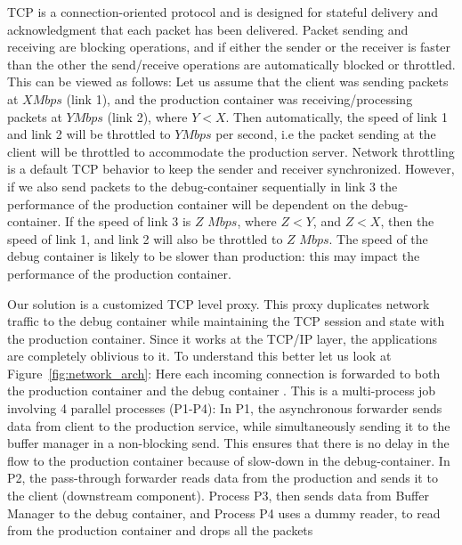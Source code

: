 TCP is a connection-oriented protocol and is designed for stateful delivery and acknowledgment that each packet has been delivered.
Packet sending and receiving are blocking operations, and if either the sender or the receiver is faster than the other the send/receive operations are automatically blocked or throttled.
This can be viewed as follows: Let us assume that the client was sending packets at $X Mbps$ (link 1), and the production container was receiving/processing packets at $Y Mbps$ (link 2), where $Y<X$. 
Then automatically, the speed of link 1 and link 2 will be throttled to $Y Mbps$ per second, i.e the packet sending at the client will be throttled to accommodate the production server. 
Network throttling is a default TCP behavior to keep the sender and receiver synchronized.
However, if we also send packets to the debug-container sequentially in link 3 the performance of the production container will be dependent on the debug-container. 
If the speed of link 3 is $Z$ $Mbps$, where $Z < Y$, and $Z < X$, then the speed of link 1, and link 2 will also be throttled to $Z$ $Mbps$.
The speed of the debug container is likely to be slower than production: this may impact the performance of the production container.

Our solution is a customized TCP level proxy. 
This proxy duplicates network traffic to the debug container while maintaining the TCP session and state with the production container. 
Since it works at the TCP/IP layer, the applications are completely oblivious to it.
To understand this better let us look at Figure~\ref{fig:network_arch}: Here each incoming connection is forwarded to both the production container and the debug container . 
This is a multi-process job involving 4 parallel processes (P1-P4): In P1, the asynchronous forwarder sends data from client to the production service, while simultaneously sending it to the buffer manager in a non-blocking send.  This ensures that there is no delay in the flow to the production container because of slow-down in the debug-container.
In P2, the pass-through forwarder reads data from the production and sends it to the client (downstream component).
Process P3, then sends data from Buffer Manager to the debug container, and Process P4 uses a dummy reader, to read from the production container and drops all the packets

